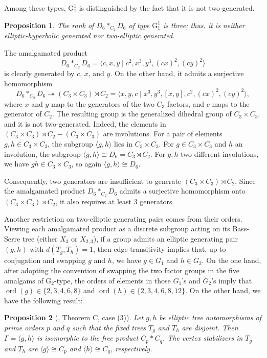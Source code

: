 \documentclass[12pt,leqno]{amsart}
\makeatletter
\renewenvironment{proof}[1][\proofname]{%
	\par
	\pushQED{\qed}%
	\normalfont
	\topsep6\p@\@plus6\p@\relax
	\trivlist
	\item[\hskip\labelsep\itshape #1\@addpunct{.}]%
	\ignorespaces
}{%
	\par\nobreak\vspace{2pt}%
	\popQED%
	\medskip%
	\endtrivlist
	\@endpefalse
}
\newcommand{\2}{L^2_{\rm per}(0, T)}
\newtheorem{prop}{Proposition}[section]
\newcommand{\ord}{{\operatorname{ord}}}
\numberwithin{equation}{section}
\numberwithin{figure}{section}
\makeatother
\begin{document}
Among these types, $\mathrm{G}_1^1$ is distinguished by the fact that it is not two-generated.
\begin{prop}\label{prop:g1_1}
    The rank of $D_6*_{C_2}D_6$ of type $\mathrm{G}_1^1$ is three; thus, it is neither elliptic-hyperbolic generated nor two-elliptic generated.
\end{prop}
\begin{proof}
    The amalgamated product
    \[
    D_6*_{C_2}D_6 = \langle c,x,y\mid c^2, x^3,y^3, (cx)^2, (cy)^2\rangle
    \]
    is clearly generated by $c$, $x$, and $y$. On the other hand, it admits a surjective homomorphism
    \[
    D_6*_{C_2}D_6\twoheadrightarrow (C_3\times C_3)\rtimes C_2 = \langle x,y,c\mid x^3,y^3,[x,y],c^2,(cx)^2,(cy)^2\rangle,
    \]
    where $x$ and $y$ map to the generators of the two $C_3$ factors, and $c$ maps to the generator of $C_2$. The resulting group is the generalized dihedral group of $C_3\times C_3$, and it is not two-generated. Indeed, the elements in $(C_3\times C_3)\rtimes C_2 - (C_3\times C_3)$ are involutions. For a pair of elements $g,h\in C_3\times C_3$, the subgroup $\langle g,h\rangle$ lies in $C_3\times C_3$. For $g\in C_3\times C_3$ and $h$ an involution, the subgroup $\langle g,h\rangle\cong D_6 = C_3\rtimes C_2$. For $g,h$ two different involutions, we have $gh\in C_3\times C_3$, so again $\langle g,h\rangle\cong D_6$.
    
    Consequently, two generators are insufficient to generate $(C_3\times C_3)\rtimes C_2$. Since the amalgamated product $D_6*_{C_2}D_6$ admits a surjective homomorphism onto $(C_3\times C_3)\rtimes C_2$, it also requires at least $3$ generators.
\end{proof}
Another restriction on two-elliptic generating pairs comes from their orders. Viewing each amalgamated product as a discrete subgroup acting on its Bass-Serre tree (either $X_3$ or $X_{2,3}$), if a group admits an elliptic generating pair $(g,h)$ with $d(T_g,T_h) = 1$, then edge-transitivity implies that, up to conjugation and swapping $g$ and $h$, we have $g\in G_1$ and $h\in G_2$. On the one hand, after adopting the convention of swapping the two factor groups in the five amalgams of $\mathrm{G}_2$-type, the orders of elements in those $G_1$'s and $G_2$'s imply that $\ord(g)\in\{2,3,4,6,8\}$ and $\ord(h)\in\{2,3,4,6,8,12\}$. On the other hand, we have the following result:
\begin{prop}[\cite{conder2022discrete}, Theorem C, case (3)]\label{prop:prime_order}
    Let $g,h$ be elliptic tree automorphisms of prime orders $p$ and $q$ such that the fixed trees $T_g$ and $T_h$ are disjoint. Then $\Gamma = \langle g,h\rangle$ is isomorphic to the free product $C_p*C_q$. The vertex stabilizers in $T_g$ and $T_h$ are $\langle g\rangle\cong C_p$ and $\langle h\rangle\cong C_q$, respectively.
\end{prop}
\end{document}
